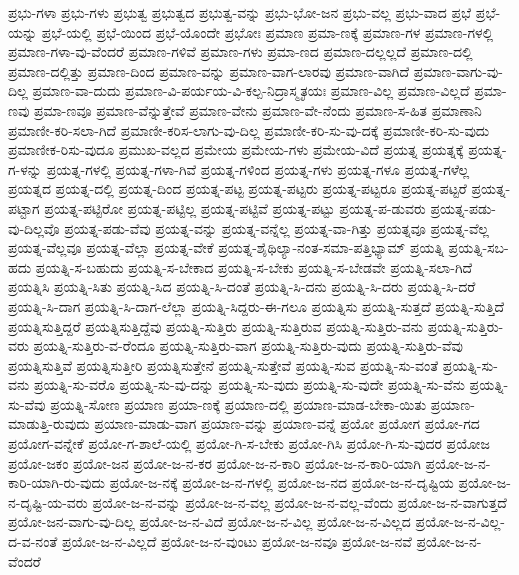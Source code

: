 {ಪ್ರಭು-ಗಳಾ
ಪ್ರಭು-ಗಳು
ಪ್ರಭುತ್ವ
ಪ್ರಭುತ್ವದ
ಪ್ರಭುತ್ವ-ವನ್ನು
ಪ್ರಭು-ಭೋ-ಜನ
ಪ್ರಭು-ವಲ್ಲ
ಪ್ರಭು-ವಾದ
ಪ್ರಭೆ
ಪ್ರಭೆ-ಯನ್ನು
ಪ್ರಭೆ-ಯಲ್ಲಿ
ಪ್ರಭೆ-ಯಿಂದ
ಪ್ರಭೆ-ಯೊಂದೇ
ಪ್ರಭೋಃ
ಪ್ರಮಾಣ
ಪ್ರಮಾ-ಣಕ್ಕೆ
ಪ್ರಮಾಣ-ಗಳ
ಪ್ರಮಾಣ-ಗಳಲ್ಲಿ
ಪ್ರಮಾಣ-ಗಳಾ-ವು-ವೆಂದರೆ
ಪ್ರಮಾಣ-ಗಳಿವೆ
ಪ್ರಮಾಣ-ಗಳು
ಪ್ರಮಾ-ಣದ
ಪ್ರಮಾಣ-ದಲ್ಲಲ್ಲದೆ
ಪ್ರಮಾಣ-ದಲ್ಲಿ
ಪ್ರಮಾಣ-ದಲ್ಲಿತ್ತು
ಪ್ರಮಾಣ-ದಿಂದ
ಪ್ರಮಾಣ-ವನ್ನು
ಪ್ರಮಾಣ-ವಾಗ-ಲಾರವು
ಪ್ರಮಾಣ-ವಾಗಿದೆ
ಪ್ರಮಾಣ-ವಾಗು-ವು-ದಿಲ್ಲ
ಪ್ರಮಾಣ-ವಾ-ದುದು
ಪ್ರಮಾಣ-ವಿ-ಪರ್ಯಯ-ವಿ-ಕಲ್ಪ-ನಿದ್ರಾಸ್ಮೃತಯಃ
ಪ್ರಮಾಣ-ವಿಲ್ಲ
ಪ್ರಮಾಣ-ವಿಲ್ಲದೆ
ಪ್ರಮಾ-ಣವು
ಪ್ರಮಾ-ಣವೂ
ಪ್ರಮಾಣ-ವೆನ್ನುತ್ತೇವೆ
ಪ್ರಮಾಣ-ವೇನು
ಪ್ರಮಾಣ-ವೇ-ನೆಂದು
ಪ್ರಮಾಣ-ಸ-ಹಿತ
ಪ್ರಮಾಣಾನಿ
ಪ್ರಮಾಣೀ-ಕರಿ-ಸಲಾ-ಗಿದೆ
ಪ್ರಮಾಣೀ-ಕರಿಸ-ಲಾಗು-ವು-ದಿಲ್ಲ
ಪ್ರಮಾಣೀ-ಕರಿ-ಸು-ವು-ದಕ್ಕೆ
ಪ್ರಮಾಣೀ-ಕರಿ-ಸು-ವುದು
ಪ್ರಮಾಣೀಕ-ರಿಸು-ವುದೂ
ಪ್ರಮುಖ-ವಲ್ಲದ
ಪ್ರಮೇಯ
ಪ್ರಮೇಯ-ಗಳು
ಪ್ರಮೇಯ-ವಿದೆ
ಪ್ರಯತ್ನ
ಪ್ರಯತ್ನಕ್ಕೆ
ಪ್ರಯತ್ನ-ಗ-ಳನ್ನು
ಪ್ರಯತ್ನ-ಗಳಲ್ಲಿ
ಪ್ರಯತ್ನ-ಗಳಾ-ಗಿವೆ
ಪ್ರಯತ್ನ-ಗಳಿಂದ
ಪ್ರಯತ್ನ-ಗಳು
ಪ್ರಯತ್ನ-ಗಳೂ
ಪ್ರಯತ್ನ-ಗಳೆಲ್ಲ
ಪ್ರಯತ್ನದ
ಪ್ರಯತ್ನ-ದಲ್ಲಿ
ಪ್ರಯತ್ನ-ದಿಂದ
ಪ್ರಯತ್ನ-ಪಟ್ಟ
ಪ್ರಯತ್ನ-ಪಟ್ಟರು
ಪ್ರಯತ್ನ-ಪಟ್ಟರೂ
ಪ್ರಯತ್ನ-ಪಟ್ಟರೆ
ಪ್ರಯತ್ನ-ಪಟ್ಟಾಗ
ಪ್ರಯತ್ನ-ಪಟ್ಟಿರೋ
ಪ್ರಯತ್ನ-ಪಟ್ಟಿಲ್ಲ
ಪ್ರಯತ್ನ-ಪಟ್ಟಿವೆ
ಪ್ರಯತ್ನ-ಪಟ್ಟು
ಪ್ರಯತ್ನ-ಪ-ಡುವರು
ಪ್ರಯತ್ನ-ಪಡು-ವು-ದಿಲ್ಲವೊ
ಪ್ರಯತ್ನ-ಪಡು-ವೆವು
ಪ್ರಯತ್ನ-ವನ್ನು
ಪ್ರಯತ್ನ-ವನ್ನೆಲ್ಲ
ಪ್ರಯತ್ನ-ವಾ-ಗಿತ್ತು
ಪ್ರಯತ್ನವೂ
ಪ್ರಯತ್ನ-ವೆಲ್ಲ
ಪ್ರಯತ್ನ-ವೆಲ್ಲವೂ
ಪ್ರಯತ್ನ-ವೆಲ್ಲಾ
ಪ್ರಯತ್ನ-ವೇಕೆ
ಪ್ರಯತ್ನ-ಶೈಥಿಲ್ಯಾ-ನಂತ-ಸಮಾ-ಪತ್ತಿಭ್ಯಾಮ್
ಪ್ರಯತ್ನಿ
ಪ್ರಯತ್ನಿ-ಸಬ-ಹದು
ಪ್ರಯತ್ನಿ-ಸ-ಬಹುದು
ಪ್ರಯತ್ನಿ-ಸ-ಬೇಕಾದ
ಪ್ರಯತ್ನಿ-ಸ-ಬೇಕು
ಪ್ರಯತ್ನಿ-ಸ-ಬೇಡವೇ
ಪ್ರಯತ್ನಿ-ಸಲಾ-ಗಿದೆ
ಪ್ರಯತ್ನಿಸಿ
ಪ್ರಯತ್ನಿ-ಸಿತು
ಪ್ರಯತ್ನಿ-ಸಿದ
ಪ್ರಯತ್ನಿ-ಸಿ-ದಂತೆ
ಪ್ರಯತ್ನಿ-ಸಿ-ದನು
ಪ್ರಯತ್ನಿ-ಸಿ-ದರು
ಪ್ರಯತ್ನಿ-ಸಿ-ದರೆ
ಪ್ರಯತ್ನಿ-ಸಿ-ದಾಗ
ಪ್ರಯತ್ನಿ-ಸಿ-ದಾಗ-ಲೆಲ್ಲಾ
ಪ್ರಯತ್ನಿ-ಸಿದ್ದರು-ಈ-ಗಲೂ
ಪ್ರಯತ್ನಿಸು
ಪ್ರಯತ್ನಿ-ಸುತ್ತದೆ
ಪ್ರಯತ್ನಿ-ಸುತ್ತಿದೆ
ಪ್ರಯತ್ನಿಸುತ್ತಿದ್ದರೆ
ಪ್ರಯತ್ನಿಸುತ್ತಿದ್ದೆವು
ಪ್ರಯತ್ನಿ-ಸುತ್ತಿರು
ಪ್ರಯತ್ನಿ-ಸುತ್ತಿರುವ
ಪ್ರಯತ್ನಿ-ಸುತ್ತಿರು-ವನು
ಪ್ರಯತ್ನಿ-ಸುತ್ತಿರು-ವರು
ಪ್ರಯತ್ನಿ-ಸುತ್ತಿರು-ವ-ರೆಂದೂ
ಪ್ರಯತ್ನಿ-ಸುತ್ತಿರು-ವಾಗ
ಪ್ರಯತ್ನಿ-ಸುತ್ತಿರು-ವುದು
ಪ್ರಯತ್ನಿ-ಸುತ್ತಿರು-ವೆವು
ಪ್ರಯತ್ನಿಸುತ್ತಿವೆ
ಪ್ರಯತ್ನಿಸುತ್ತೀರಿ
ಪ್ರಯತ್ನಿಸುತ್ತೇನೆ
ಪ್ರಯತ್ನಿ-ಸುತ್ತೇವೆ
ಪ್ರಯತ್ನಿ-ಸುವ
ಪ್ರಯತ್ನಿ-ಸು-ವಂತೆ
ಪ್ರಯತ್ನಿ-ಸು-ವನು
ಪ್ರಯತ್ನಿ-ಸು-ವರೊ
ಪ್ರಯತ್ನಿ-ಸು-ವು-ದನ್ನು
ಪ್ರಯತ್ನಿ-ಸು-ವುದು
ಪ್ರಯತ್ನಿ-ಸು-ವುದೇ
ಪ್ರಯತ್ನಿ-ಸು-ವೆನು
ಪ್ರಯತ್ನಿ-ಸು-ವೆವು
ಪ್ರಯತ್ನಿ-ಸೋಣ
ಪ್ರಯಾಣ
ಪ್ರಯಾ-ಣಕ್ಕೆ
ಪ್ರಯಾಣ-ದಲ್ಲಿ
ಪ್ರಯಾಣ-ಮಾಡ-ಬೇಕಾ-ಯಿತು
ಪ್ರಯಾಣ-ಮಾಡುತ್ತಿ-ರುವುದು
ಪ್ರಯಾಣ-ಮಾಡು-ವಾಗ
ಪ್ರಯಾಣ-ವನ್ನು
ಪ್ರಯಾಣ-ವನ್ನೆ
ಪ್ರಯೋ
ಪ್ರಯೋಗ
ಪ್ರಯೋ-ಗದ
ಪ್ರಯೋಗ-ವನ್ನೇಕೆ
ಪ್ರಯೋ-ಗ-ಶಾಲೆ-ಯಲ್ಲಿ
ಪ್ರಯೋ-ಗಿ-ಸ-ಬೇಕು
ಪ್ರಯೋ-ಗಿಸಿ
ಪ್ರಯೋ-ಗಿ-ಸು-ವುದರ
ಪ್ರಯೋಜ
ಪ್ರಯೋ-ಜಕಂ
ಪ್ರಯೋ-ಜನ
ಪ್ರಯೋ-ಜ-ನ-ಕರ
ಪ್ರಯೋ-ಜ-ನ-ಕಾರಿ
ಪ್ರಯೋ-ಜ-ನ-ಕಾರಿ-ಯಾಗಿ
ಪ್ರಯೋ-ಜ-ನ-ಕಾರಿ-ಯಾಗಿ-ರು-ವುದು
ಪ್ರಯೋ-ಜ-ನಕ್ಕೆ
ಪ್ರಯೋ-ಜ-ನ-ಗಳಲ್ಲಿ
ಪ್ರಯೋ-ಜ-ನದ
ಪ್ರಯೋ-ಜ-ನ-ದೃಷ್ಟಿಯ
ಪ್ರಯೋ-ಜ-ನ-ದೃಷ್ಟಿ-ಯ-ವರು
ಪ್ರಯೋ-ಜ-ನ-ವನ್ನು
ಪ್ರಯೋ-ಜ-ನ-ವಲ್ಲ
ಪ್ರಯೋ-ಜ-ನ-ವಲ್ಲ-ವೆಂದು
ಪ್ರಯೋ-ಜ-ನ-ವಾಗುತ್ತದೆ
ಪ್ರಯೋ-ಜನ-ವಾಗು-ವು-ದಿಲ್ಲ
ಪ್ರಯೋ-ಜ-ನ-ವಿದೆ
ಪ್ರಯೋ-ಜ-ನ-ವಿಲ್ಲ
ಪ್ರಯೋ-ಜ-ನ-ವಿಲ್ಲದ
ಪ್ರಯೋ-ಜ-ನ-ವಿಲ್ಲ-ದ-ವ-ನಂತೆ
ಪ್ರಯೋ-ಜ-ನ-ವಿಲ್ಲದೆ
ಪ್ರಯೋ-ಜ-ನ-ವುಂಟು
ಪ್ರಯೋ-ಜ-ನವೂ
ಪ್ರಯೋ-ಜ-ನವೆ
ಪ್ರಯೋ-ಜ-ನ-ವೆಂದರೆ
}
